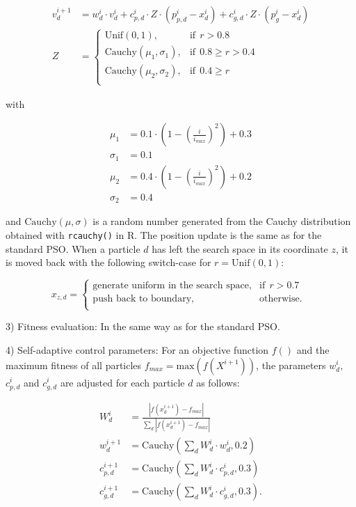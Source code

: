 \documentclass[
  oneside, a4paper, 12pt, openany]{book}
\theoremstyle{definition}
\theoremstyle{definition}
\theoremstyle{definition}
\theoremstyle{definition}
\theoremstyle{remark}
\begin{document}
\begin{align*}
  v_d^{i+1} &= w_d^i \cdot v_d^{i}+c_{p,d}^i \cdot Z \cdot (p_{p,d}^i-x_d^i) + c_{g,d}^i \cdot Z \cdot (p_{g}^i-x_d^i) \\
  Z &= \begin{cases}
    \text{Unif}(0,1), & \text{if}\ \ r > 0.8\\
    \text{Cauchy}(\mu_1, \sigma_1), & \text{if}\ \ 0.8 \geq r > 0.4\\
    \text{Cauchy}(\mu_2, \sigma_2), & \text{if}\ \ 0.4 \geq r\\
  \end{cases}
\end{align*}

with

\begingroup
\allowdisplaybreaks

\begin{align*}
  \mu_1 &= 0.1 \cdot (1-(\frac{i}{i_{max}})^2) + 0.3 \\
  \sigma_1 &= 0.1 \\
  \mu_2 &= 0.4 \cdot (1-(\frac{i}{i_{max}})^2) + 0.2 \\
  \sigma_2 &= 0.4
\end{align*}
\endgroup

and \(\text{Cauchy}(\mu, \sigma)\) is a random number generated from the Cauchy distribution obtained with \texttt{rcauchy()} in R. The position update is the same as for the standard PSO. When a particle \(d\) has left the search space in its coordinate \(z\), it is moved back with the following switch-case for \(r = \text{Unif}(0,1)\):

\[
  x_{z,d} = 
  \begin{cases}
    \text{generate uniform in the search space}, & \text{if}\ \ r > 0.7\\
    \text{push back to boundary}, & \text{otherwise.}\ \ \\
  \end{cases}
\]

3) Fitness evaluation: In the same way as for the standard PSO.

4) Self-adaptive control parameters: For an objective function \(f()\) and the maximum fitness of all particles \(f_{max} = \text{max}(f(X^{i+1}))\), the parameters \(w_d^{i}\), \(c_{p,d}^{i}\) and \(c_{g,d}^{i}\) are adjusted for each particle \(d\) as follows:

\begin{align*}
  W^i_d &= \frac{\left| f(x_d^{i+1})-f_{max} \right|}{\sum_d\left| f(x_d^{i+1})-f_{max} \right|} \\
  w_d^{i+1} &= \text{Cauchy}(\sum_d W^i_d \cdot w_d^{i}, 0.2) \\
  c_{p,d}^{i+1} &= \text{Cauchy}(\sum_d W^i_d \cdot c_{p,d}^{i}, 0.3) \\
  c_{g,d}^{i+1} &= \text{Cauchy}(\sum_d W^i_d \cdot c_{g,d}^{i}, 0.3).
\end{align*}
\end{document}
